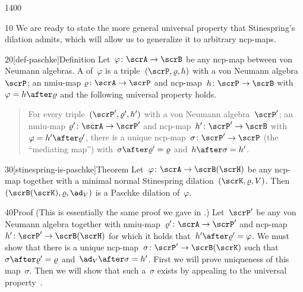 \begin{parsec}{1400}%
\begin{point}{10}%
    We are ready to state the more general universal property
        that Stinespring's dilation admits,
        which will allow us to generalize it to arbitrary ncp-maps.
\end{point}
%
%
\spacingfix{}
\begin{point}{20}[def-paschke]{Definition}%
    Let~$\varphi\colon \scrA \to \scrB$
        be any ncp-map between von Neumann algebras.
    A  of~$\varphi$
    is a triple~$(\scrP, \varrho, h)$
    with a von Neumann algebra~$\scrP$;
    an nmiu-map $\varrho \colon \scrA \to \scrP$
    and ncp-map~$h \colon \scrP \to \scrB$
    with~$\varphi = h \after \varrho$
    and the following universal property holds.
\begin{quote}
    For every triple~$(\scrP', \varrho', h')$
    with a von Neumann algebra~$\scrP'$;
    an nmiu-map $\varrho'\colon \scrA \to \scrP'$
    and ncp-map~$h' \colon \scrP' \to \scrB$
    with~$\varphi = h' \after \varrho'$,
    there is a unique ncp-map~$\sigma \colon \scrP' \to \scrP$
    (the ``mediating map'')
    with~$\sigma \after \varrho' = \varrho$
    and~$h \after \sigma = h'$.
\end{quote}

\par %
\end{point}
\spacingfix{}
\begin{point}{30}[stinespring-is-paschke]{Theorem}%
Let~$\varphi\colon \scrA \to \scrB(\scrH)$
    be any ncp-map
    together with a minimal normal Stinespring dilation~$(\scrK,\varrho,V)$.
    Then $(\scrB(\scrK), \varrho, \ad_V)$
        is a Paschke dilation of~$\varphi$.
\begin{point}{40}{Proof}%
(This is essentially the same proof
    we gave in \cite{wwpaschke}.)
%
\noindent Let~$\scrP'$ be any von Neumann algebra
    together with nmiu-map~$\varrho'\colon \scrA \to \scrP'$
    and ncp-map~$h'\colon \scrP' \to \scrB(\scrH)$
    for which it holds that~$h' \after \varrho' = \varphi$.
We must show that there is a unique
    ncp-map~$\sigma\colon \scrP' \to \scrB(\scrK)$
    such that~$\sigma \after \varrho' = \varrho$
    and~$\ad_V \after \sigma = h'$.
First we will prove uniqueness of this map~$\sigma$.
Then we will show that such a~$\sigma$ exists
    by appealing to the universal property~.


\end{point}
\end{point}
\end{parsec}
